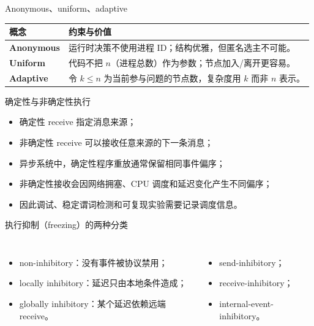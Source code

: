 \documentclass[UTF8,fontset=none,aspectratio=169,10pt]{beamer}
\begin{document}
\begin{frame}{Anonymous、uniform、adaptive}
\begin{tabularx}{\linewidth}{>{\bfseries}p{2.4cm}X}
\toprule
概念 & 约束与价值 \\
\midrule
Anonymous & 运行时决策不使用进程 ID；结构优雅，但匿名选主不可能。 \\
Uniform & 代码不把 $n$（进程总数）作为参数；节点加入/离开更容易。 \\
Adaptive & 令 $k\le n$ 为当前参与问题的节点数，复杂度用 $k$ 而非 $n$ 表示。 \\
\bottomrule
\end{tabularx}
\vfill
{}
\end{frame}

\begin{frame}{确定性与非确定性执行}
\begin{itemize}
  \item 确定性 receive 指定消息来源；
  \item 非确定性 receive 可以接收任意来源的下一条消息；
  \item 异步系统中，确定性程序重放通常保留相同事件偏序；
  \item 非确定性接收会因网络拥塞、CPU 调度和延迟变化产生不同偏序；
  \item 因此调试、稳定谓词检测和可复现实验需要记录调度信息。
\end{itemize}
\end{frame}

\begin{frame}{执行抑制（freezing）的两种分类}
\begin{columns}[T,onlytextwidth]
\begin{itemize}
  \item non-inhibitory：没有事件被协议禁用；
  \item locally inhibitory：延迟只由本地条件造成；
  \item globally inhibitory：某个延迟依赖远端 receive。
\end{itemize}
\begin{itemize}
  \item send-inhibitory；
  \item receive-inhibitory；
  \item internal-event-inhibitory。
\end{itemize}
\end{columns}
\vfill
{}
\end{frame}
\end{document}
